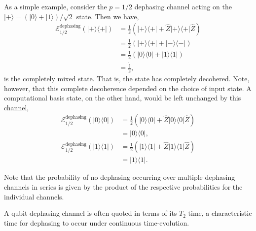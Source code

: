 \documentclass[aps,rmp,twocolumn,amsmath,amssymb,nofootinbib,superscriptaddress]{revtex4}
\newcommand{\bra}[1]{\langle#1|}
\newcommand{\ket}[1]{|#1\rangle}
\begin{document}
As a simple example, consider the \mbox{$p=1/2$} dephasing channel acting on the \mbox{$\ket{+} = (\ket{0}+\ket{1})/\sqrt{2}$} state. Then we have,
\begin{align}
\mathcal{E}^\mathrm{dephasing}_{1/2}(\ket{+}\bra{+}) &= \frac{1}{2} (\ket{+}\bra{+} + \hat{Z}\ket{+}\bra{+}\hat{Z}) \nonumber \\
&= \frac{1}{2} (\ket{+}\bra{+} + \ket{-}\bra{-}) \nonumber \\
&= \frac{1}{2} (\ket{0}\bra{0} + \ket{1}\bra{1}) \nonumber \\
&= \frac{\mathbb{\hat{I}}}{2},
\end{align}
is the completely mixed state. That is, the state has completely decohered. Note, however, that this complete decoherence depended on the choice of input state. A computational basis state, on the other hand, would be left unchanged by this channel,
\begin{align}
\mathcal{E}^\mathrm{dephasing}_{1/2}(\ket{0}\bra{0}) &= \frac{1}{2} (\ket{0}\bra{0} + \hat{Z}\ket{0}\bra{0}\hat{Z}) \nonumber \\
&= \ket{0}\bra{0}, \nonumber \\
\mathcal{E}^\mathrm{dephasing}_{1/2}(\ket{1}\bra{1}) &= \frac{1}{2} (\ket{1}\bra{1} + \hat{Z}\ket{1}\bra{1}\hat{Z}) \nonumber \\
&= \ket{1}\bra{1}.
\end{align}

Note that the probability of no dephasing occurring over multiple dephasing channels in series is given by the product of the respective probabilities for the individual channels.

A qubit dephasing channel is often quoted in terms of its $T_2$-time, a characteristic time for dephasing to occur under continuous time-evolution.
\end{document}
